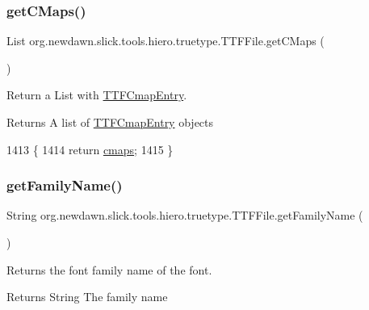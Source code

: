 \subsubsection{\texorpdfstring{get\+C\+Maps()}{getCMaps()}}
{\footnotesize\ttfamily List org.\+newdawn.\+slick.\+tools.\+hiero.\+truetype.\+T\+T\+F\+File.\+get\+C\+Maps (\begin{DoxyParamCaption}{ }\end{DoxyParamCaption})\hspace{0.3cm}{\ttfamily [inline]}}

Return a List with \mbox{\hyperlink{classorg_1_1newdawn_1_1slick_1_1tools_1_1hiero_1_1truetype_1_1_t_t_f_cmap_entry}{T\+T\+F\+Cmap\+Entry}}. \begin{DoxyReturn}{Returns}
A list of \mbox{\hyperlink{classorg_1_1newdawn_1_1slick_1_1tools_1_1hiero_1_1truetype_1_1_t_t_f_cmap_entry}{T\+T\+F\+Cmap\+Entry}} objects 
\end{DoxyReturn}

\begin{DoxyCode}
1413                            \{
1414         \textcolor{keywordflow}{return} \mbox{\hyperlink{classorg_1_1newdawn_1_1slick_1_1tools_1_1hiero_1_1truetype_1_1_t_t_f_file_a2485473f90e9a1361c892560e662d156}{cmaps}};
1415     \}
\end{DoxyCode}
\mbox{\label{classorg_1_1newdawn_1_1slick_1_1tools_1_1hiero_1_1truetype_1_1_t_t_f_file_a2b4dc4a9e27d6fa60fb7305d8ee43912}} 
\subsubsection{\texorpdfstring{get\+Family\+Name()}{getFamilyName()}}
{\footnotesize\ttfamily String org.\+newdawn.\+slick.\+tools.\+hiero.\+truetype.\+T\+T\+F\+File.\+get\+Family\+Name (\begin{DoxyParamCaption}{ }\end{DoxyParamCaption})\hspace{0.3cm}{\ttfamily [inline]}}

Returns the font family name of the font. \begin{DoxyReturn}{Returns}
String The family name 
\end{DoxyReturn}

